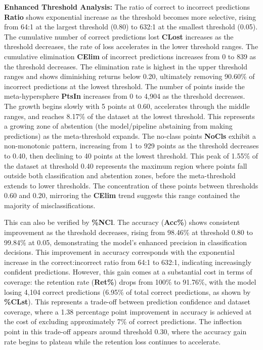 \noindent \textbf{Enhanced Threshold Analysis:} The ratio of correct to incorrect predictions \textbf{Ratio} shows exponential increase as the threshold becomes more selective, rising from 64:1 at the largest threshold (0.80) to 632:1 at the smallest threshold (0.05). The cumulative number of correct predictions lost \textbf{CLost} increases as the threshold decreases, the rate of loss accelerates in the lower threshold ranges. The cumulative elimination \textbf{CElim} of incorrect predictions increases from 0 to 839 as the threshold decreases. The elimination rate is highest in the upper threshold ranges and shows diminishing returns below 0.20, ultimately removing 90.60\% of incorrect predictions at the lowest threshold. The number of points inside the meta-hypersphere \textbf{PtsIn} increases from 0 to 4,904 as the threshold decreases. The growth begins slowly with 5 points at 0.60, accelerates through the middle ranges, and reaches 8.17\% of the dataset at the lowest threshold. This represents a growing zone of abstention (the model/pipeline abstaining from making predictions) as the meta-threshold expands. The no-class points \textbf{NoCls} exhibit a non-monotonic pattern, increasing from 1 to 929 points as the threshold decreases to 0.40, then declining to 40 points at the lowest threshold. This peak of 1.55\% of the dataset at threshold 0.40 represents the maximum region where points fall outside both classification and abstention zones, before the meta-threshold extends to lower thresholds. The concentration of these points between thresholds 0.60 and 0.20, mirroring the \textbf{CElim} trend suggests this range contained the majority of misclassifications. 



This can also be verified by \textbf{\%NCl}. The accuracy (\textbf{Acc\%}) shows consistent improvement as the threshold decreases, rising from 98.46\% at threshold 0.80 to 99.84\% at 0.05, demonstrating the model's enhanced precision in classification decisions. This improvement in accuracy corresponds with the exponential increase in the correct:incorrect ratio from 64:1 to 632:1, indicating increasingly confident predictions. However, this gain comes at a substantial cost in terms of coverage: the retention rate (\textbf{Ret\%}) drops from 100\% to 91.76\%, with the model losing 4,104 correct predictions (6.95\% of total correct predictions, as shown by \textbf{\%CLst}). This represents a trade-off between prediction confidence and dataset coverage, where a 1.38 percentage point improvement in accuracy is achieved at the cost of excluding approximately 7\% of correct predictions. The inflection point in this trade-off appears around threshold 0.30, where the accuracy gain rate begins to plateau while the retention loss continues to accelerate. 



